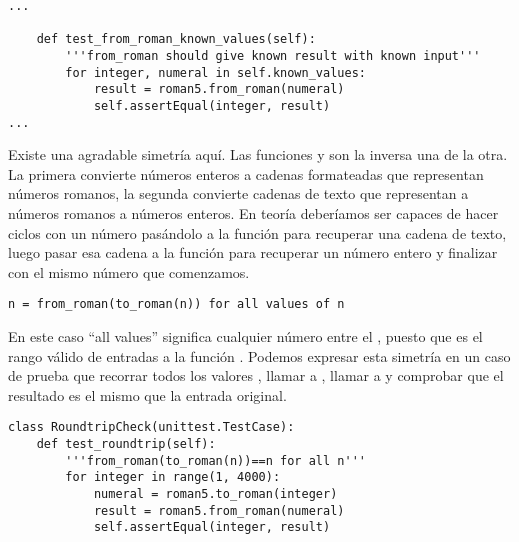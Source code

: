 \noindent\begin{minipage}{\textwidth}
\begin{lstlisting}[mathescape=True]
...

    def test_from_roman_known_values(self):
        '''from_roman should give known result with known input'''
        for integer, numeral in self.known_values:
            result = roman5.from_roman(numeral)
            self.assertEqual(integer, result)
...
\end{lstlisting}
\end{minipage}

Existe una agradable simetría aquí. Las funciones  y  son la inversa una de la otra. La primera convierte números enteros a cadenas formateadas que representan números romanos, la segunda convierte cadenas de texto que representan a números romanos a números enteros. En teoría deberíamos ser capaces de hacer ciclos con un número pasándolo a la función  para recuperar una cadena de texto, luego pasar esa cadena a la función  para recuperar un número entero y finalizar con el mismo número que comenzamos.

\noindent\begin{minipage}{\textwidth}
\begin{lstlisting}[mathescape=True]
n = from_roman(to_roman(n)) for all values of n
\end{lstlisting}
\end{minipage}

En este caso ``all values'' significa cualquier número entre el , puesto que es el rango válido de entradas a la función . Podemos expresar esta simetría en un caso de prueba que recorrar todos los valores , llamar a , llamar a  y comprobar que el resultado es el mismo que la entrada original.

\noindent\begin{minipage}{\textwidth}
\begin{lstlisting}[mathescape=True]
class RoundtripCheck(unittest.TestCase):
    def test_roundtrip(self):
        '''from_roman(to_roman(n))==n for all n'''
        for integer in range(1, 4000):
            numeral = roman5.to_roman(integer)
            result = roman5.from_roman(numeral)
            self.assertEqual(integer, result)
\end{lstlisting}
\end{minipage}

